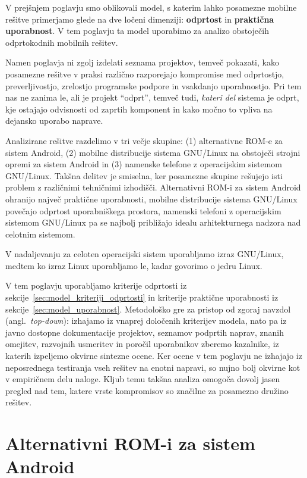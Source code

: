 \documentclass[a4paper,12pt,openright]{book}
\begin{document}
V prejšnjem poglavju smo oblikovali model, s katerim lahko posamezne mobilne rešitve primerjamo glede na dve ločeni dimenziji: \textbf{odprtost} in \textbf{praktična uporabnost}.
V tem poglavju ta model uporabimo za analizo obstoječih odprtokodnih mobilnih rešitev.

Namen poglavja ni zgolj izdelati seznama projektov, temveč pokazati, kako posamezne rešitve v praksi različno razporejajo kompromise med odprtostjo, preverljivostjo, zrelostjo programske podpore in vsakdanjo uporabnostjo.
Pri tem nas ne zanima le, ali je projekt \enquote{odprt}, temveč tudi, \emph{kateri del} sistema je odprt, kje ostajajo odvisnosti od zaprtih komponent in kako močno to vpliva na dejansko uporabo naprave.

Analizirane rešitve razdelimo v tri večje skupine:
(1) alternativne ROM-e za sistem Android,
(2) mobilne distribucije sistema GNU/Linux na obstoječi strojni opremi za sistem Android in
(3) namenske telefone z operacijskim sistemom GNU/Linux.
Takšna delitev je smiselna, ker posamezne skupine rešujejo isti problem z različnimi tehničnimi izhodišči.
Alternativni ROM-i za sistem Android ohranijo največ praktične uporabnosti, mobilne distribucije sistema GNU/Linux povečajo odprtost uporabniškega prostora, namenski telefoni z operacijskim sistemom GNU/Linux pa se najbolj približajo idealu arhitekturnega nadzora nad celotnim sistemom.

V nadaljevanju za celoten operacijski sistem uporabljamo izraz GNU/Linux, medtem ko izraz Linux uporabljamo le, kadar govorimo o jedru Linux.

V tem poglavju uporabljamo kriterije odprtosti iz sekcije~\ref{sec:model_kriteriji_odprtosti} in kriterije praktične uporabnosti iz sekcije~\ref{sec:model_uporabnost}.
Metodološko gre za pristop od zgoraj navzdol (angl.~\textit{top-down}): izhajamo iz vnaprej določenih kriterijev modela, nato pa iz javno dostopne dokumentacije projektov, seznamov podprtih naprav, znanih omejitev, razvojnih usmeritev in poročil uporabnikov zberemo kazalnike, iz katerih izpeljemo okvirne sintezne ocene.
Ker ocene v tem poglavju ne izhajajo iz neposrednega testiranja vseh rešitev na enotni napravi, so nujno bolj okvirne kot v empiričnem delu naloge.
Kljub temu takšna analiza omogoča dovolj jasen pregled nad tem, katere vrste kompromisov so značilne za posamezno družino rešitev.

\section{Alternativni ROM-i za sistem Android}
\label{sec:analiza_android_romi}
\end{document}
